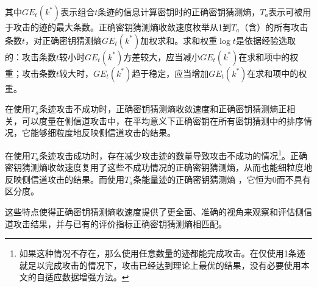 {	\noindent 其中$GE_t(k^*)$表示组合$t$条迹的信息计算密钥时的正确密钥猜测熵，$T_a$表示可被用于攻击的迹的最大条数。正确密钥猜测熵收敛速度枚举从1到$T_a$（含）的所有攻击条数$t$，对正确密钥猜测熵$GE_t(k^*)$加权求和。求和权重$\log t$是依据经验选取的：攻击条数$t$较小时$GE_t(k^*)$方差较大，应当减小$GE_t(k^*)$在求和项中的权重；攻击条数$t$较大时，$GE_t(k^*)$趋于稳定，应当增加$GE_t(k^*)$在求和项中的权重。
	
	在使用$T_a$条迹攻击不成功时，正确密钥猜测熵收敛速度和正确密钥猜测熵正相关，可以度量在侧信道攻击中，在平均意义下正确密钥在所有密钥猜测中的排序情况，它能够细粒度地反映侧信道攻击的结果。
	
	在使用$T_a$条迹攻击成功时，存在减少攻击迹的数量导致攻击不成功的情况\footnote{如果这种情况不存在，那么使用任意数量的迹都能完成攻击。在仅使用1条迹就足以完成攻击的情况下，攻击已经达到理论上最优的结果，没有必要使用本文的自适应数据增强方法。}。正确密钥猜测熵收敛速度复用了这些不成功情况的正确密钥猜测熵，从而也能细粒度地反映侧信道攻击的结果。而使用$T_a$条能量迹的正确密钥猜测熵 ，它恒为0而不具有区分度。
	
	这些特点使得正确密钥猜测熵收速度提供了更全面、准确的视角来观察和评估侧信道攻击结果，并与已有的评价指标正确密钥猜测熵相匹配。
	
}
